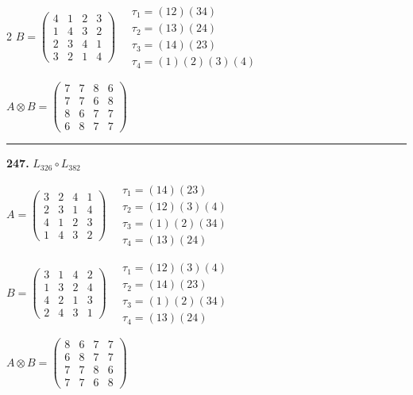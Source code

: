 \begin{multicols}{2}
$B = \begin{pmatrix} 4 & 1 & 2 & 3 \\ 1 & 4 & 3 & 2 \\ 2 & 3 & 4 & 1 \\ 3 & 2 & 1 & 4 \end{pmatrix} \quad \begin{matrix} \tau_{1}=(1 2)(3 4) \\ \tau_{2}=(1 3)(2 4) \\ \tau_{3}=(1 4)(2 3) \\ \tau_{4}=(1)(2)(3)(4) \end{matrix}$

$A \otimes B = \begin{pmatrix} 7 & 7 & 8 & 6 \\ 7 & 7 & 6 & 8 \\ 8 & 6 & 7 & 7 \\ 6 & 8 & 7 & 7 \end{pmatrix}$

\vspace{0.3em}
\hrule
\vspace{0.3em}

\noindent\textbf{247.} $L_{326} \circ L_{382}$

$A = \begin{pmatrix} 3 & 2 & 4 & 1 \\ 2 & 3 & 1 & 4 \\ 4 & 1 & 2 & 3 \\ 1 & 4 & 3 & 2 \end{pmatrix} \quad \begin{matrix} \tau_{1}=(1 4)(2 3) \\ \tau_{2}=(1 2)(3)(4) \\ \tau_{3}=(1)(2)(3 4) \\ \tau_{4}=(1 3)(2 4) \end{matrix}$

$B = \begin{pmatrix} 3 & 1 & 4 & 2 \\ 1 & 3 & 2 & 4 \\ 4 & 2 & 1 & 3 \\ 2 & 4 & 3 & 1 \end{pmatrix} \quad \begin{matrix} \tau_{1}=(1 2)(3)(4) \\ \tau_{2}=(1 4)(2 3) \\ \tau_{3}=(1)(2)(3 4) \\ \tau_{4}=(1 3)(2 4) \end{matrix}$

$A \otimes B = \begin{pmatrix} 8 & 6 & 7 & 7 \\ 6 & 8 & 7 & 7 \\ 7 & 7 & 8 & 6 \\ 7 & 7 & 6 & 8 \end{pmatrix}$


\end{multicols}
